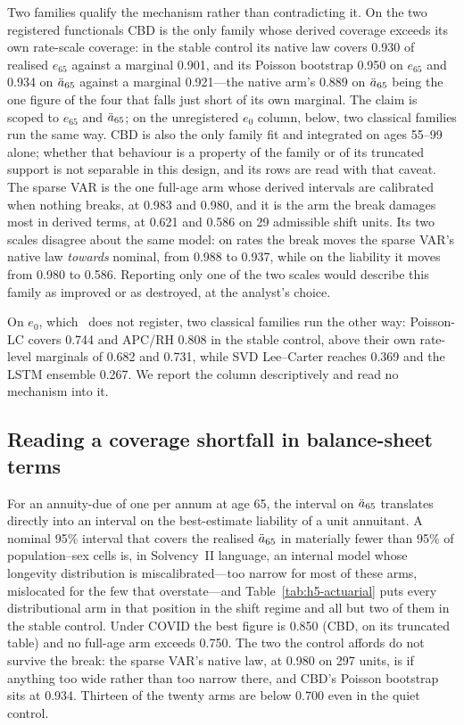 Two families qualify the mechanism rather than contradicting it. On the two
registered functionals CBD is the only family whose derived coverage
exceeds its own rate-scale coverage: in the stable control its native law
covers 0.930 of realised $e_{65}$ against a marginal 0.901, and its Poisson
bootstrap 0.950 on $e_{65}$ and 0.934 on $\ddot{a}_{65}$ against a marginal
0.921---the native arm's 0.889 on $\ddot{a}_{65}$ being the one figure of the
four that falls just short of its own marginal. The claim is scoped to
$e_{65}$ and $\ddot{a}_{65}$; on the unregistered $e_0$ column, below, two
classical families run the same way. CBD is also the only family fit and
integrated on ages 55--99 alone; whether that behaviour is a property of
the family or of its truncated support is not separable in this design, and
its rows are read with that caveat. The sparse VAR is the one full-age arm
whose derived intervals are calibrated when nothing breaks, at 0.983 and
0.980, and it is the arm the break damages most in derived terms, at 0.621
and 0.586 on 29 admissible shift units. Its two scales disagree about the
same model: on rates the break moves the sparse VAR's native law
\emph{towards} nominal, from 0.988 to 0.937, while on the liability it
moves from 0.980 to 0.586. Reporting only one of the two scales would
describe this family as improved or as destroyed, at the analyst's choice.

On $e_0$, which \Hfive\ does not register, two classical families run the
other way: Poisson-LC covers 0.744 and APC/RH 0.808 in the stable control,
above their own rate-level marginals of 0.682 and 0.731, while SVD
Lee--Carter reaches 0.369 and the LSTM ensemble 0.267. We report the column
descriptively and read no mechanism into it.

\subsection{Reading a coverage shortfall in balance-sheet terms}

For an annuity-due of one per annum at age 65, the interval on $\ddot{a}_{65}$
translates directly into an interval on the best-estimate liability of a
unit annuitant. A nominal 95\% interval that covers the realised $\ddot{a}_{65}$
in materially fewer than 95\% of population--sex cells is, in Solvency~II
language, an internal model whose longevity distribution is
miscalibrated---too narrow for most of these arms, mislocated for the few
that overstate---and Table~\ref{tab:h5-actuarial} puts every distributional
arm in that position in the shift regime and all but two of them in the
stable control. Under COVID the best figure is 0.850 (CBD, on its truncated
table) and no full-age arm exceeds 0.750. The two the control affords do
not survive the break: the sparse VAR's native law, at 0.980 on 297 units,
is if anything too wide rather than too narrow there, and CBD's Poisson
bootstrap sits at 0.934. Thirteen of the twenty arms are below 0.700 even
in the quiet control.

